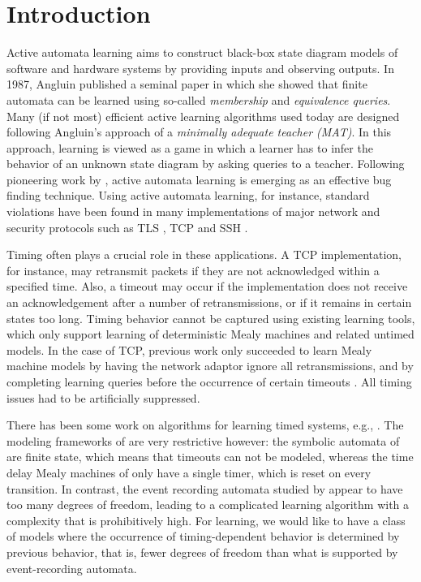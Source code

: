 \section{Introduction}
\label{sec:intro}

Active automata learning aims to construct black-box state diagram models of software and hardware systems
by providing inputs and observing outputs.
In 1987, Angluin \cite{Ang87} published a seminal paper in which she showed that finite automata can be learned using so-called \emph{membership} and \emph{equivalence queries}.
Many (if not most) efficient active learning algorithms used
today are designed following Angluin's approach of a \emph{minimally adequate teacher (MAT)}.
In this approach, learning is viewed as a game in which a learner has to infer the behavior of
an unknown state diagram by asking queries to a teacher.
Following pioneering work by \cite{Ang87,PeVaYa02,Hagerer2002,RaMeSM2009,IsHoSt2015},
active automata learning is emerging as an effective bug finding technique.
Using active automata learning, for instance, standard violations have been found in many implementations of
major network and security protocols such as TLS \cite{dRP15}, TCP \cite{FJV14,FJV16,FH17} and SSH \cite{FiterauEtAl17}.

Timing often plays a crucial role in these applications.
A TCP implementation, for instance, may retransmit packets if they are not acknowledged within
a specified time. Also, a timeout may occur if the implementation does not receive an acknowledgement
after a number of retransmissions, or if it remains in certain states too long.
Timing behavior cannot be captured using existing learning tools, which only support learning of deterministic
Mealy machines and related untimed models.
In the case of TCP, previous work only succeeded to learn Mealy machine models by having the network adaptor 
ignore all retransmissions, and by completing learning queries before the occurrence of certain timeouts \cite{FJV16}.
All timing issues had to be artificially suppressed.

There has been some work on algorithms for learning timed systems, e.g., \cite{GrinchteinJL10,MensM15,CCF16}.
The modeling frameworks of \cite{MensM15,CCF16} are very restrictive however: the symbolic automata of \cite{MensM15}
are finite state, which means that timeouts can not be modeled, whereas the time delay Mealy machines of
\cite{CCF16} only have a single timer, which is reset on every transition.
In contrast, the event recording automata studied by \cite{GrinchteinJL10} appear to have too many degrees of freedom,
leading to a complicated learning algorithm with a complexity that is prohibitively high.
For learning, we would like to have a class of models where the occurrence of timing-dependent behavior
is determined by previous behavior, that is, fewer degrees of freedom than what is supported by event-recording automata.

